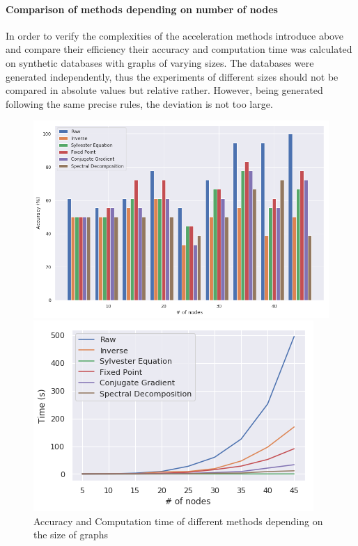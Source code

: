 \documentclass{article}
\theoremstyle{definition}
\begin{document}
\paragraph{Comparison of methods depending on number of nodes}
In order to verify the complexities of the acceleration methods introduce above and compare their efficiency their accuracy and computation time was calculated on synthetic databases with graphs of varying sizes. The databases were generated independently, thus the experiments of different sizes should not be compared in absolute values but relative rather. However, being generated following the same precise rules, the deviation is not too large.
\begin{figure}[!htb]
	\begin{multicols}{2}
		\includegraphics[width=\linewidth]{data/nb_nodes/acc.png}\par
		\includegraphics[width=\linewidth]{data/nb_nodes/time.png}\par
	\end{multicols}
\caption{Accuracy and Computation time of different methods depending on the size of graphs}
\end{figure}
\end{document}
